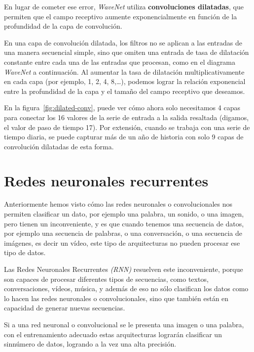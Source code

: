 \documentclass[a4paper,12pt]{article}
\begin{document}
En lugar de cometer ese error, \textit{WaveNet} utiliza \textbf{convoluciones dilatadas}, que permiten que el campo receptivo aumente exponencialmente en función de la profundidad de la capa de convolución. 

En una capa de convolución dilatada, los filtros no se aplican a las entradas de una manera secuencial simple, sino que omiten una entrada de tasa de dilatación constante entre cada una de las entradas que procesan, como en el diagrama \textit{WaveNet} a continuación. Al aumentar la tasa de dilatación multiplicativamente en cada capa (por ejemplo, 1, 2, 4, 8,…), podemos lograr la relación exponencial entre la profundidad de la capa y el tamaño del campo receptivo que deseamos. 

En la figura~\ref{fig:dilated-conv}, puede ver cómo ahora solo necesitamos 4 capas para conectar los 16 valores de la serie de entrada a la salida resaltada (digamos, el valor de paso de tiempo 17). Por extensión, cuando se trabaja con una serie de tiempo diaria, se puede capturar más de un año de historia con solo 9 capas de convolución dilatadas de esta forma.

\section{Redes neuronales recurrentes}
Anteriormente hemos visto cómo las redes neuronales o convolucionales nos permiten clasificar un dato, por ejemplo una palabra, un sonido, o una imagen, pero tienen un inconveniente, y es que cuando tenemos una secuencia de datos, por ejemplo una secuencia de palabras, o una conversación, o una secuencia de imágenes, es decir un vídeo, este tipo de arquitecturas no pueden procesar ese tipo de datos. 

Las Redes Neuronales Recurrentes \textit{(RNN)} \citep{karpathy:rnn} resuelven este inconveniente, porque son capaces de procesar diferentes tipos de secuencias, como textos, conversaciones, vídeos, música, y además de eso no sólo clasifican los datos como lo hacen las redes neuronales o convolucionales, sino que también están en capacidad de generar nuevas secuencias.

Si a una red neuronal o convolucional se le presenta una imagen o una palabra, con el entrenamiento adecuado estas arquitecturas lograrán clasificar un sinnúmero de datos, logrando a la vez una alta precisión. 
\end{document}
